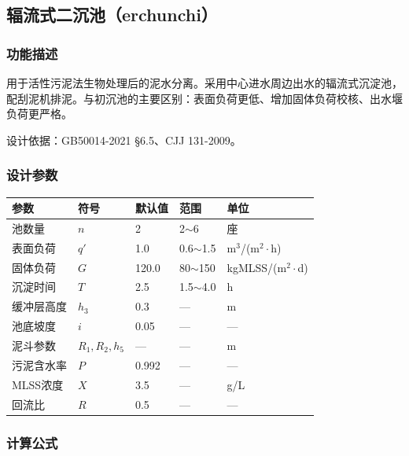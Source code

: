 \documentclass[12pt,a4paper]{ctexart}
\begin{document}
\newpage

\subsection{辐流式二沉池（erchunchi）}

\subsubsection{功能描述}
用于活性污泥法生物处理后的泥水分离。采用中心进水周边出水的辐流式沉淀池，配刮泥机排泥。与初沉池的主要区别：表面负荷更低、增加固体负荷校核、出水堰负荷更严格。

设计依据：GB50014-2021 \S6.5、CJJ 131-2009。

\subsubsection{设计参数}
\begin{table}[h]
\centering
\begin{tabular}{@{}lllll@{}}
\toprule
参数 & 符号 & 默认值 & 范围 & 单位 \\
\midrule
池数量       & $n$ & 2 & 2$\sim$6 & 座 \\
表面负荷     & $q'$ & 1.0 & 0.6$\sim$1.5 & m$^3$/(m$^2\cdot$h) \\
固体负荷     & $G$ & 120.0 & 80$\sim$150 & kgMLSS/(m$^2\cdot$d) \\
沉淀时间     & $T$ & 2.5 & 1.5$\sim$4.0 & h \\
缓冲层高度   & $h_3$ & 0.3 & — & m \\
池底坡度     & $i$ & 0.05 & — & — \\
泥斗参数     & $R_1,R_2,h_5$ & — & — & m \\
污泥含水率   & $P$ & 0.992 & — & — \\
MLSS浓度     & $X$ & 3.5 & — & g/L \\
回流比       & $R$ & 0.5 & — & — \\
\bottomrule
\end{tabular}
\end{table}

\subsubsection{计算公式}
\end{document}
